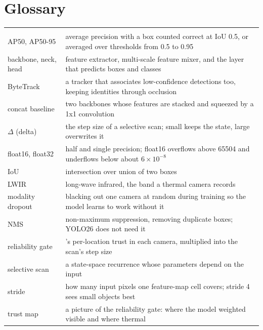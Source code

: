 \chapter{Glossary}

\begin{longtable}{@{}P{3.6cm}P{10.2cm}@{}}
 &  \\
AP50, AP50-95 & average precision with a box counted correct at IoU 0.5, or averaged over thresholds from 0.5 to 0.95 \\
backbone, neck, head & feature extractor, multi-scale feature mixer, and the layer that predicts boxes and classes \\
ByteTrack & a tracker that associates low-confidence detections too, keeping identities through occlusion \\
concat baseline & two backbones whose features are stacked and squeezed by a 1x1 convolution \\
$\Delta$ (delta) & the step size of a selective scan; small keeps the state, large overwrites it \\
float16, float32 & half and single precision; float16 overflows above 65504 and underflows below about $6\times10^{-8}$ \\
IoU & intersection over union of two boxes \\
LWIR & long-wave infrared, the band a thermal camera records \\
modality dropout & blacking out one camera at random during training so the model learns to work without it \\
NMS & non-maximum suppression, removing duplicate boxes; YOLO26 does not need it \\
reliability gate & \method{}'s per-location trust in each camera, multiplied into the scan's step size \\
selective scan & a state-space recurrence whose parameters depend on the input \\
stride & how many input pixels one feature-map cell covers; stride 4 sees small objects best \\
trust map & a picture of the reliability gate: where the model weighted visible and where thermal \\
\end{longtable}
